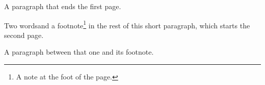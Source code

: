 \documentclass{article}
\begin{document}
\vspace*{18.5cm}

A paragraph that ends the first page.

Two words\linebreak and a footnote\footnote{A note at the foot of the page.} in the rest of this short paragraph, which starts the second page.

A paragraph between that one and its footnote.
\end{document}
